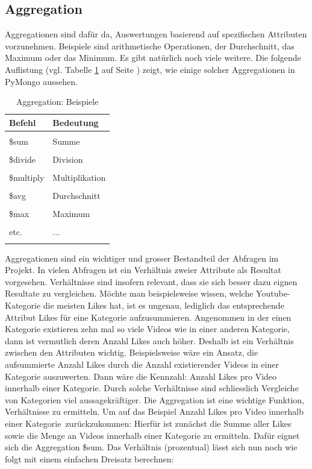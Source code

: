 \documentclass[12pt,titlepage]{article}
\begin{document}
\subsection{Aggregation} \label{Aggregation}
Aggregationen sind dafür da, Auswertungen basierend auf spezifischen Attributen vorzunehmen. Beispiele sind arithmetische Operationen, der Durchschnitt, das Maximum oder das Minimum. Es gibt natürlich noch viele weitere. Die folgende Auflistung (vgl. Tabelle \ref{Aggregation: Beispiele} auf Seite \pageref{Aggregation: Beispiele}) zeigt, wie einige solcher Aggregationen in PyMongo aussehen.
\begin{table}[htbp]
\centering
\begin{tabular}{ll}
\hline
Befehl & Bedeutung\\
\hline\\
\$sum & Summe \\
\hline\\
\$divide & Division \\
\hline\\
\$multiply & Multiplikation \\
\hline\\
\$avg & Durchschnitt \\
\hline\\
\$max & Maximum \\
\hline\\
etc. & ... \\
\hline\\
\end{tabular}
\caption[Aggregation: Beispiele]{Aggregation: Beispiele}
\label{Aggregation: Beispiele}
\end{table}
Aggregationen sind ein wichtiger und grosser Bestandteil der Abfragen im Projekt. In vielen Abfragen ist ein Verhältnis zweier Attribute als Resultat vorgesehen. Verhältnisse sind insofern relevant, dass sie sich besser dazu eignen Resultate zu vergleichen. Möchte man beispielsweise wissen, welche Youtube-Kategorie die meisten Likes hat, ist es ungenau, lediglich das entsprechende Attribut Likes für eine Kategorie aufzusummieren. Angenommen in der einen Kategorie existieren zehn mal so viele Videos wie in einer anderen Kategorie, dann ist vermutlich deren Anzahl Likes auch höher. Deshalb ist ein Verhältnis zwischen den Attributen wichtig. Beispielsweise wäre ein Ansatz, die aufsummierte Anzahl Likes durch die Anzahl existierender Videos in einer Kategorie auszuwerten. Dann wäre die Kennzahl: \glqq Anzahl Likes pro Video innerhalb einer Kategorie\grqq. Durch solche Verhältnisse sind schliesslich Vergleiche von Kategorien viel aussagekräftiger. Die Aggregation ist eine wichtige Funktion, Verhältnisse zu ermitteln. Um auf das Beispiel \glqq Anzahl Likes pro Video innerhalb einer Kategorie\grqq\, zurückzukommen: Hierfür ist zunächst die Summe aller Likes sowie die Menge an Videos innerhalb einer Kategorie zu ermitteln. Dafür eignet sich die Aggregation \glqq \$sum\grqq. Das Verhältnis (prozentual) lässt sich nun noch wie folgt mit einem einfachen Dreisatz berechnen:
\end{document}
